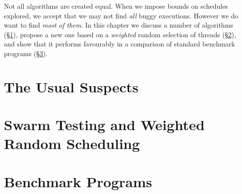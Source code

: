 \chapstart Not all algorithms are created equal.
When we impose bounds on schedules explored, we accept that we may not find \emph{all} buggy
executions.  However we do want to find \emph{most of them}.  In this chapter we discuss a number of
algorithms (\S\ref{sec:algorithms-usual}), propose a new one based on a \emph{weighted} random
selection of threads (\S\ref{sec:algorithms-swarm}), and show that it performs favourably in a
comparison of standard benchmark programs (\S\ref{sec:algorithms-sctbench}).

\section{The Usual Suspects}
\label{sec:algorithms-usual}

\blindtext

\section{Swarm Testing and Weighted Random Scheduling}
\label{sec:algorithms-swarm}

\blindtext

\section{Benchmark Programs}
\label{sec:algorithms-sctbench}

\blindtext
